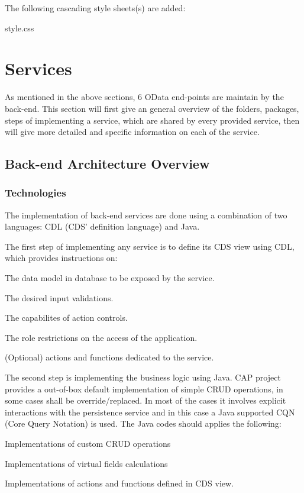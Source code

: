 \bigskip
The following cascading style sheets(s) are added:
\begin{compactenum}
    \item style.css
\end{compactenum}


\section{Services}
\label{sec:D-srv}

As mentioned in the above sections, 6 OData end-points are maintain by the back-end. This section will first give an general overview of the folders, packages, steps of implementing a service, which are shared by every provided service, then will give more detailed and specific information on each of the service.

\subsection{Back-end Architecture Overview}

\subsubsection{Technologies}

The implementation of back-end services are done using a combination of two languages: CDL (CDS' definition language) and Java.

\bigskip
The first step of implementing any service is to define its CDS view using CDL, which provides instructions on:
\begin{compactenum}
	\item The data model in database to be exposed by the service.
	\item The desired input validations.
	\item The capabilites of action controls.
    \item The role restrictions on the access of the application.
    \item (Optional) actions and functions dedicated to the service.
\end{compactenum}

\bigskip

The second step is implementing the business logic using Java. CAP project provides a out-of-box default implementation of simple CRUD operations, in some cases shall be override/replaced. In most of the cases it involves explicit interactions with the persistence service and in this case a Java supported CQN (Core Query Notation) is used. The Java codes should applies the following:
\begin{compactenum}
	\item Implementations of custom CRUD operations
	\item Implementations of virtual fields calculations
	\item Implementations of actions and functions defined in CDS view.
\end{compactenum}


